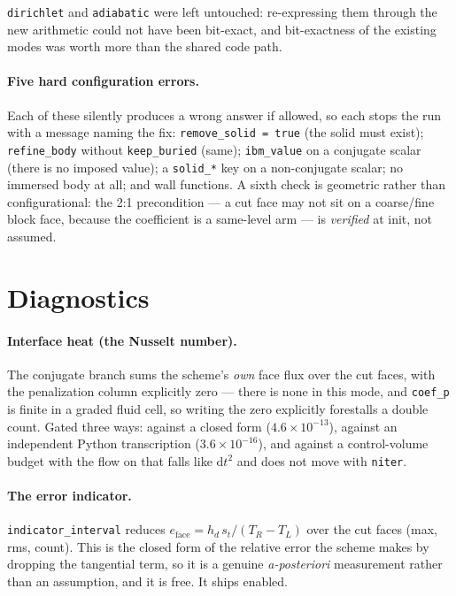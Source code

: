 \documentclass[11pt,a4paper]{article}
\newcommand{\code}[1]{\texttt{#1}}
\begin{document}
\code{dirichlet} and \code{adiabatic} were left untouched: re-expressing them
through the new arithmetic could not have been bit-exact, and bit-exactness of
the existing modes was worth more than the shared code path.

\paragraph{Five hard configuration errors.}
Each of these silently produces a wrong answer if allowed, so each stops the
run with a message naming the fix:
\code{remove\_solid = true} (the solid must exist);
\code{refine\_body} without \code{keep\_buried} (same);
\code{ibm\_value} on a conjugate scalar (there is no imposed value);
a \code{solid\_*} key on a non-conjugate scalar;
no immersed body at all;
and wall functions. A sixth check is geometric rather than configurational: the
2:1 precondition --- a cut face may not sit on a coarse/fine block face,
because the coefficient is a same-level arm --- is \emph{verified} at init, not
assumed.

\section{Diagnostics}

\paragraph{Interface heat (the Nusselt number).}
The conjugate branch sums the scheme's \emph{own} face flux over the cut faces,
with the penalization column explicitly zero --- there is none in this mode,
and \code{coef\_p} is finite in a graded fluid cell, so writing the zero
explicitly forestalls a double count. Gated three ways: against a closed form
($4.6\times10^{-13}$), against an independent Python transcription
($3.6\times10^{-16}$), and against a control-volume budget with the flow on
that falls like $\mathrm{d}t^2$ and does not move with \code{niter}.

\paragraph{The error indicator.}
\code{indicator\_interval} reduces
$e_{\text{face}} = h_d\,s_t/(T_R-T_L)$ over the cut faces (max, rms, count).
This is the closed form of the relative error the scheme makes by dropping the
tangential term, so it is a genuine \emph{a-posteriori} measurement rather than
an assumption, and it is free. It ships enabled.
\end{document}
